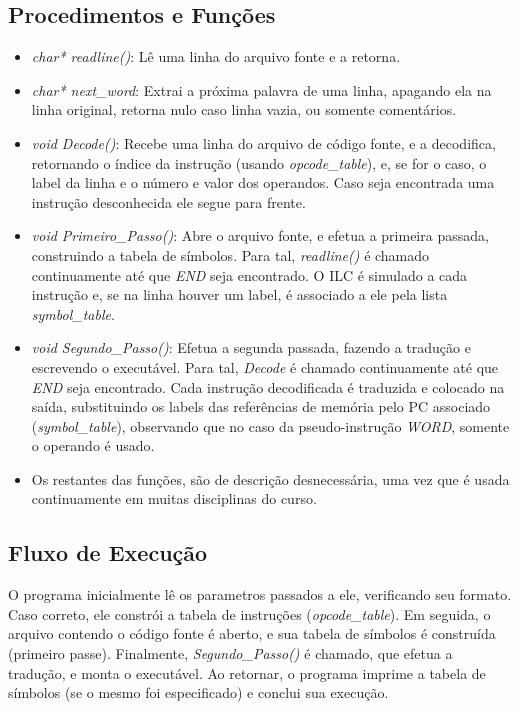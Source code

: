 \documentclass[12pt, a4paper]{article}
\begin{document}
\subsection{Procedimentos e Funções}

\begin{itemize}
	\item \emph{char* readline()}: Lê uma linha do arquivo fonte e a retorna.
	\item \emph{char* next\_word}: Extrai a próxima palavra de uma linha, apagando ela na linha original, retorna nulo caso linha vazia, ou somente comentários.
	\item \emph{void Decode()}: Recebe uma linha do arquivo de código fonte, e a decodifica, retornando o índice da instrução (usando \emph{opcode\_table}), e, se for o caso, o label da linha e o número e valor dos operandos. Caso seja encontrada uma instrução desconhecida ele segue para frente.
	\item \emph{void Primeiro\_Passo()}: Abre o arquivo fonte, e efetua a primeira passada, construindo a tabela de símbolos. Para tal, \emph{readline()} é chamado continuamente até que \emph{END} seja encontrado. O ILC é simulado a cada instrução e, se na linha houver um label, é associado a ele pela lista \emph{symbol\_table}. 
	\item \emph{void Segundo\_Passo()}: Efetua a segunda passada, fazendo a tradução e escrevendo o executável. Para tal, \emph{Decode} é chamado continuamente até que \emph{END} seja encontrado. Cada instrução decodificada é traduzida e colocado na saída, substituindo os labels das referências de memória pelo PC associado (\emph{symbol\_table}), observando que no caso da pseudo-instrução \emph{WORD}, somente o operando é usado.  
	\item Os restantes das funções, são de descrição desnecessária, uma vez que é usada continuamente em muitas disciplinas do curso.
\end{itemize}

\subsection{Fluxo de Execução}

O programa inicialmente lê os parametros passados a ele, verificando seu formato. Caso correto, ele constrói a tabela de instruções (\emph{opcode\_table}). Em seguida, o arquivo contendo o código fonte é aberto, e sua tabela de símbolos é construída (primeiro passe). Finalmente, \emph{Segundo\_Passo()} é chamado, que efetua a tradução, e monta o executável. Ao retornar, o programa imprime a tabela de símbolos (se o mesmo foi especificado) e conclui sua execução.
\end{document}
